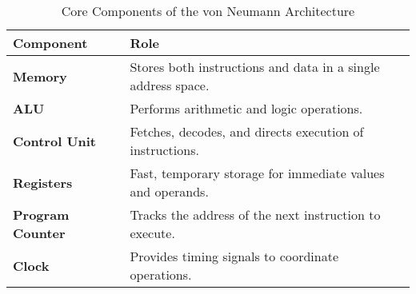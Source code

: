 \documentclass[12pt]{article}
\begin{document}
\begin{table}[h!]
\centering
\begin{tabular}{|l|p{8cm}|}
\hline
\textbf{Component} & \textbf{Role} \\
\hline
\textbf{Memory} & Stores both instructions and data in a single address space. \\
\hline
\textbf{ALU} & Performs arithmetic and logic operations. \\
\hline
\textbf{Control Unit} & Fetches, decodes, and directs execution of instructions. \\
\hline
\textbf{Registers} & Fast, temporary storage for immediate values and operands. \\
\hline
\textbf{Program Counter} & Tracks the address of the next instruction to execute. \\
\hline
\textbf{Clock} & Provides timing signals to coordinate operations. \\
\hline
\end{tabular}
\caption{Core Components of the von Neumann Architecture}
\end{table}
\end{document}
